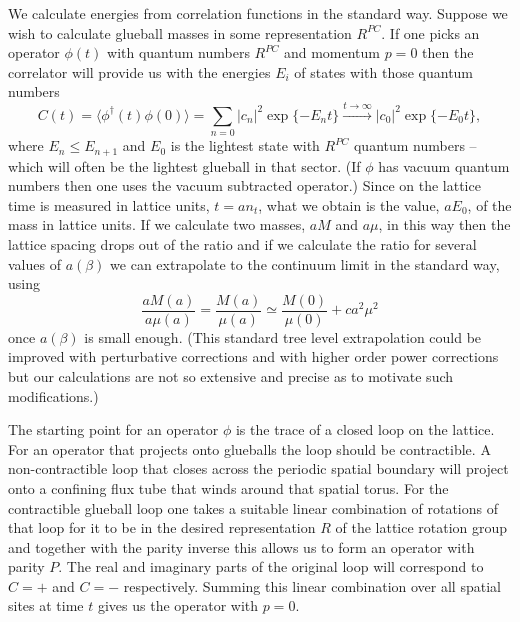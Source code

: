 \documentclass[12pt]{article}
\begin{document}
We calculate energies from correlation functions in the standard way. Suppose we wish to
calculate glueball masses in some representation $R^{PC}$. If one picks an operator $\phi(t)$
with quantum numbers $R^{PC}$ and momentum $p=0$ then the correlator will provide us with
the energies $E_i$ of states with those quantum numbers 
%
\begin{equation}
  C(t) = \langle \phi^{\dagger}(t)\phi(0)\rangle
  = \sum_{n=0} |c_n|^2 \exp\{-E_nt\} \stackrel{t\to\infty}{\longrightarrow}
  |c_0|^2 \exp\{-E_0t\},
\label{eqn_C}
\end{equation}
%
where $E_n\leq E_{n+1}$ and $E_0$ is the lightest state with $R^{PC}$ quantum numbers --
which will often be the lightest glueball in that sector. (If $\phi$ has vacuum quantum
numbers then one uses the vacuum subtracted operator.)
Since on the lattice time is measured in lattice units, $t=an_t$, 
what we obtain is the value, $aE_0$, of the mass in lattice units. If we calculate two masses,
$aM$ and $a\mu$, in this way then the lattice spacing drops out of the ratio and if we
calculate the ratio for several values of $a(\beta)$ we can extrapolate to the continuum
limit in the standard way, using
%
\begin{equation}
 \frac{aM(a)}{a\mu(a)} = \frac{M(a)}{\mu(a)} \simeq \frac{M(0)}{\mu(0)} + ca^2\mu^2 
\label{eqn_cont}
\end{equation}
%
once  $a(\beta)$ is small enough. (This standard tree level extrapolation could be improved with
perturbative corrections
%
\cite{Sommer-cutoff}
%
and with higher order power corrections but our calculations are not so extensive and precise as to
motivate such modifications.)

The starting point for an operator $\phi$ is the trace of a closed loop on the lattice.
For an operator that projects onto glueballs the loop should be contractible.
A non-contractible loop that closes across the periodic spatial boundary
will project onto a confining flux tube that winds around that spatial torus.
For the contractible glueball loop one takes a suitable linear combination of rotations
of that loop for it to be in the desired representation $R$ of the lattice rotation
group and together with the parity inverse this allows us to form an operator
with parity $P$. The real and imaginary parts of the original loop will correspond to
$C=+$ and $C=-$ respectively. Summing this linear combination over all spatial sites
at time $t$ gives us the operator with $p=0$.
\end{document}

